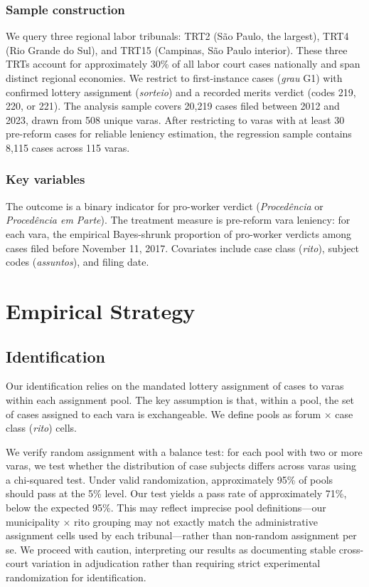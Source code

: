 \documentclass[12pt]{article}
\begin{document}
\subsubsection*{Sample construction} We query three regional labor tribunals: TRT2 (S\~{a}o Paulo, the largest), TRT4 (Rio Grande do Sul), and TRT15 (Campinas, S\~{a}o Paulo interior). These three TRTs account for approximately 30\% of all labor court cases nationally and span distinct regional economies. We restrict to first-instance cases (\textit{grau} G1) with confirmed lottery assignment (\textit{sorteio}) and a recorded merits verdict (codes 219, 220, or 221). The analysis sample covers 20,219 cases filed between 2012 and 2023, drawn from 508 unique varas. After restricting to varas with at least 30 pre-reform cases for reliable leniency estimation, the regression sample contains 8,115 cases across 115 varas.

\subsubsection*{Key variables} The outcome is a binary indicator for pro-worker verdict (\textit{Proced\^{e}ncia} or \textit{Proced\^{e}ncia em Parte}). The treatment measure is pre-reform vara leniency: for each vara, the empirical Bayes-shrunk proportion of pro-worker verdicts among cases filed before November 11, 2017. Covariates include case class (\textit{rito}), subject codes (\textit{assuntos}), and filing date.



\section{Empirical Strategy}

\subsection{Identification}

Our identification relies on the mandated lottery assignment of cases to varas within each assignment pool. The key assumption is that, within a pool, the set of cases assigned to each vara is exchangeable. We define pools as forum $\times$ case class (\textit{rito}) cells.

We verify random assignment with a balance test: for each pool with two or more varas, we test whether the distribution of case subjects differs across varas using a chi-squared test. Under valid randomization, approximately 95\% of pools should pass at the 5\% level. Our test yields a pass rate of approximately 71\%, below the expected 95\%. This may reflect imprecise pool definitions---our municipality $\times$ rito grouping may not exactly match the administrative assignment cells used by each tribunal---rather than non-random assignment per se. We proceed with caution, interpreting our results as documenting stable cross-court variation in adjudication rather than requiring strict experimental randomization for identification.
\end{document}
